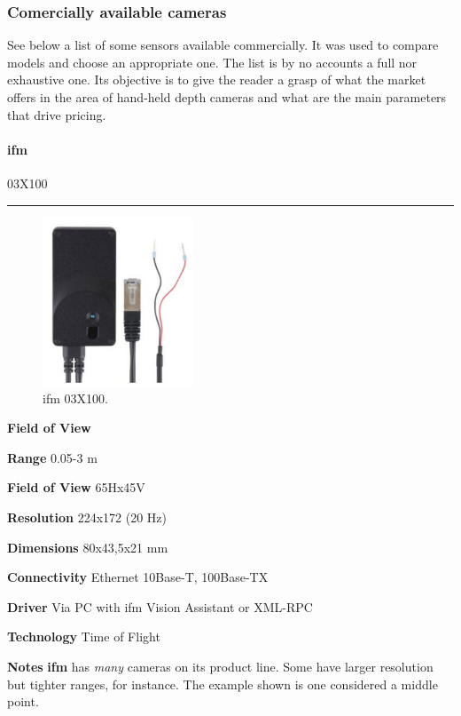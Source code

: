 \documentclass[../main.tex]{subfiles}
\begin{document}
\subsubsection{Comercially available cameras}
See below a list of some sensors available commercially. It was used to compare models and choose an appropriate one. The list is by no accounts a full nor exhaustive one. Its objective is to give the reader a grasp of what the market offers in the area of hand-held depth cameras and what are the main parameters that drive pricing. 

\vspace{1em}
\paragraph{\large \textbf{ifm}} {\large 03X100}

\noindent\rule{8cm}{0.1pt}
\begin{figure}[H]
    \centering
    \includegraphics[width=0.4\textwidth]{images/ifm03X100.png}
    \caption{ifm 03X100.}
    \label{fig:ifm03X100}
\end{figure}
\begin{labeling}{\textbf{Field of View    }}
    \setlength{\itemindent}{2em}
    \item [\textbf{Range}] 0.05-3 m
    \item [\textbf{Field of View}] 65Hx45V
    \item [\textbf{Resolution}] 224x172 (20 Hz)
    \item [\textbf{Dimensions}] 80x43,5x21 mm
    \item [\textbf{Connectivity}] Ethernet 10Base-T, 100Base-TX
    \item [\textbf{Driver}] Via PC with ifm Vision Assistant or XML-RPC
    \item [\textbf{Technology}] Time of Flight
    \item [\textbf{Notes}] \textbf{ifm} has \emph{many} cameras on its product line. Some have larger resolution but tighter ranges, for instance. The example shown is one considered a middle point.
\end{labeling}
\vspace{1em}
\end{document}
